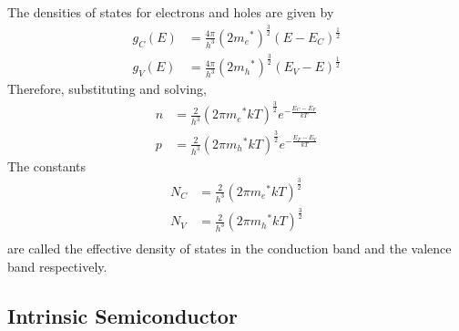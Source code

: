 \documentclass[titlepage, fleqn, a4paper, 12pt, twoside]{article}
\theoremstyle{definition}
\theoremstyle{theorem}
\begin{document}
The densities of states for electrons and holes are given by
\begin{align*}
	g_C(E) & = \frac{4 \pi}{h^3} \left( 2 {m_e}^* \right)^{\frac{3}{2}} (E - E_C)^{\frac{1}{2}} \\
	g_V(E) & = \frac{4 \pi}{h^3} \left( 2 {m_h}^* \right)^{\frac{3}{2}} (E_V - E)^{\frac{1}{2}}
\end{align*}
Therefore, substituting and solving,
\begin{align*}
	n & = \frac{2}{h^3} \left( 2 \pi {m_e}^* k T \right)^{\frac{3}{2}} e^{-\frac{E_C - E_F}{k T}} \\
	p & = \frac{2}{h^3} \left( 2 \pi {m_h}^* k T \right)^{\frac{3}{2}} e^{-\frac{E_F - E_V}{k T}}
\end{align*}
The constants
\begin{align*}
	N_C & = \frac{2}{h^3} \left( 2 \pi {m_e}^* k T \right)^{\frac{3}{2}} \\
	N_V & = \frac{2}{h^3} \left( 2 \pi {m_h}^* k T \right)^{\frac{3}{2}} \\
\end{align*}
are called the effective density of states in the conduction band and the valence band respectively.

\subsection{Intrinsic Semiconductor}
\end{document}
